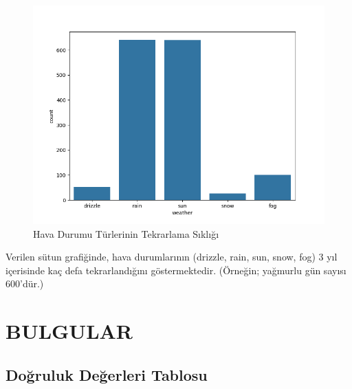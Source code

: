 \documentclass[twocolumn]{article}
\begin{document}
	\begin{figure}[H]
		\centering
		\includegraphics[width=\linewidth]{"Figures/Figure8.png"}
		\caption{Hava Durumu Türlerinin Tekrarlama Sıklığı}
		\label{fig:ornek}
		
	\end{figure}
	Verilen sütun grafiğinde, hava durumlarının (drizzle, rain, sun, snow, fog) 3 yıl içerisinde kaç defa tekrarlandığını göstermektedir. (Örneğin; yağmurlu gün sayısı 600'dür.)
	
	\section{BULGULAR}
	\subsection{Doğruluk Değerleri Tablosu}
	
	\begin{table}[h]
		\centering
		\caption{Model Performansı}
		\label{tab:model-performansi}
	\end{table}
	
\end{document}
